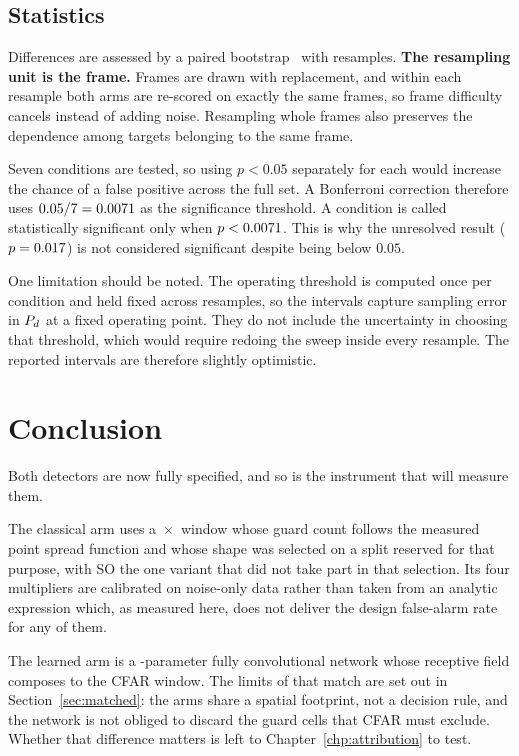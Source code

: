 \subsection{Statistics}

Differences are assessed by a paired bootstrap~\cite{efron1993bootstrap} with
\ProtocolBootstrap{} resamples. \textbf{The
resampling unit is the frame.} Frames are drawn with replacement, and within each resample both arms
are re-scored on exactly the same frames, so frame difficulty cancels instead of adding noise.
Resampling whole frames also preserves the dependence among targets belonging to the same frame.

Seven conditions are tested, so using $p < 0.05$ separately for each would increase the chance of a
false positive across the full set. A Bonferroni correction therefore uses
$0.05/7 = 0.0071$ as the significance threshold. A condition is called statistically
significant only when $p < 0.0071$. This is why the unresolved result
($p = 0.017$) is not considered significant despite being below $0.05$.

One limitation should be noted. The operating threshold is computed once per condition and held fixed
across resamples, so the intervals capture sampling error in $P_{d}$ at a fixed operating point. They
do not include the uncertainty in choosing that threshold, which would require redoing the sweep
inside every resample. The reported intervals are therefore slightly optimistic.

\section{Conclusion}

Both detectors are now fully specified, and so is the instrument that will measure them.

The classical arm uses a \CfarWinR{}\,$\times$\,\CfarWinD{} window whose guard count follows the
measured point spread function and whose shape was selected on a split reserved for that purpose,
with SO the one variant that did not take part in that selection. Its four multipliers are calibrated
on noise-only data rather than taken from an analytic expression which, as measured here, does not
deliver the design false-alarm rate for any of them.

The learned arm is a \TinyParams{}-parameter fully convolutional network whose receptive field
composes to the CFAR window. The limits of that match are set out in Section~\ref{sec:matched}: the
arms share a spatial footprint, not a decision rule, and the network is not obliged to discard the
guard cells that CFAR must exclude. Whether that difference matters is left to
Chapter~\ref{chp:attribution} to test.

